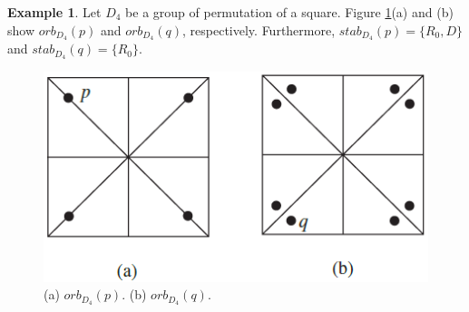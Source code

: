 \documentclass{article}
\newtheorem{theorem}{Theorem}[section]
\theoremstyle{definition}
\newtheorem{example}{Example}[section]
\begin{document}
     \begin{example}
         Let $D_4$ be a group of permutation of a square. Figure \ref{D_4}(a) and (b) show $orb_{D_4}(p)$ and $orb_{D_4}(q)$, respectively. Furthermore, $stab_{D_4}(p) = \{R_0,D\}$ and $stab_{D_4}(q)=\{R_0\}$.
         
         \begin{figure}[!htbp]
             \centering
             \includegraphics[width=0.6\linewidth]{figures/exp7.8.png}
             \caption{(a) $orb_{D_4}(p)$. (b) $orb_{D_4}(q)$.}
             \label{D_4}
         \end{figure}
     \end{example}
     
     \noindent{}
     
\end{document}
